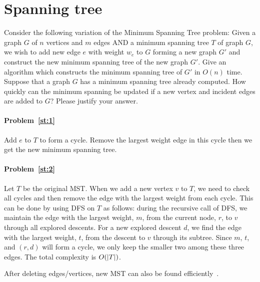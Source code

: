 \section{Spanning tree}
\begin{Exercise}
\Question Consider the following variation of the Minimum Spanning Tree problem: Given a graph $G$ of $n$ vertices and $m$ edges AND a minimum spanning tree $T$ of graph $G$, we wish to add new edge $e$ with weight $w_e$ to $G$ forming a new graph $G'$ and construct the new minimum spanning tree of the new graph $G'$. Give an algorithm which constructs the minimum spanning tree of $G'$ in $O(n)$ time. \label{st:1}
\Question Suppose that a graph $G$ has a minimum spanning tree already computed. How quickly can the minimum spanning be updated if a new vertex and incident edges are added to $G$? Please justify your answer. \label{st:2}
\end{Exercise}
\begin{Answer}
\paragraph{Problem~\ref{st:1}}
Add $e$ to $T$ to form a cycle. Remove the largest weight edge in this cycle then we get the new minimum spanning tree.

\paragraph{Problem~\ref{st:2}}
Let $T$ be the original MST. When we add a new vertex $v$ to $T$, we need to check all cycles and then remove the edge with the largest weight from each cycle. This can be done by using DFS on $T$ as follows: during the recursive call of DFS, we maintain the edge with the largest weight, $m$, from the current node, $r$, to $v$ through all explored descents. For a new explored descent $d$, we find the edge with the largest weight, $t$, from the descent to $v$ through its subtree. Since $m$, $t$, and $(r, d)$ will form a cycle, we only keep the smaller two among these three edges. The total complexity is $O(\lvert T\rvert)$.
\begin{remark}
After deleting edges/vertices, new MST can also be found efficiently~\cite{Chin1978,Das2001}.
\end{remark}
\end{Answer}

